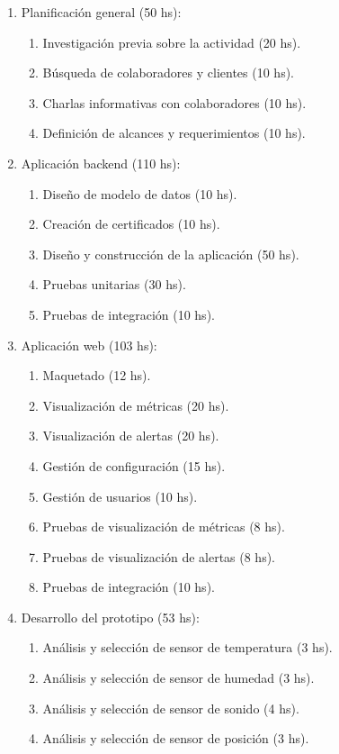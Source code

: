 \documentclass[
11pt, %
codirector, %
]{charter}
\begin{document}
\begin{enumerate}
\item Planificación general (50 hs):
	\begin{enumerate}
	\item Investigación previa sobre la actividad (20 hs).
	\item Búsqueda de colaboradores y clientes (10 hs).
	\item Charlas informativas con colaboradores (10 hs).
	\item Definición de alcances y requerimientos (10 hs).
	\end{enumerate}
\item Aplicación backend (110 hs):
	\begin{enumerate}
	\item Diseño de modelo de datos (10 hs).
	\item Creación de certificados (10 hs).
	\item Diseño y construcción de la aplicación (50 hs).
	\item Pruebas unitarias (30 hs).
	\item Pruebas de integración (10 hs).
	\end{enumerate}
\item Aplicación web (103 hs):
	\begin{enumerate}
	\item Maquetado (12 hs).
	\item Visualización de métricas (20 hs).
	\item Visualización de alertas (20 hs).
	\item Gestión de configuración (15 hs).
	\item Gestión de usuarios (10 hs).
	\item Pruebas de visualización de métricas (8 hs).
	\item Pruebas de visualización de alertas (8 hs).
	\item Pruebas de integración (10 hs).
	\end{enumerate}
\item Desarrollo del prototipo (53 hs):
	\begin{enumerate}
		\item Análisis y selección de sensor de temperatura (3 hs).
		\item Análisis y selección de sensor de humedad (3 hs).
		\item Análisis y selección de sensor de sonido (4 hs).
		\item Análisis y selección de sensor de posición (3 hs).	

\end{enumerate}
\end{enumerate}
\end{document}
